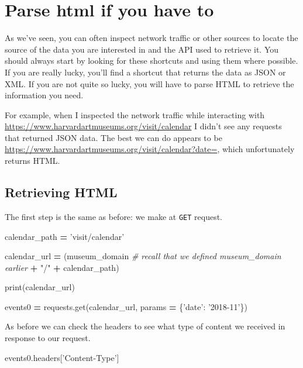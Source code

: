 \documentclass[]{book}
\newenvironment{Shaded}{\begin{snugshade}}{\end{snugshade}}
\newcommand{\StringTok}[1]{\textcolor[rgb]{0.31,0.60,0.02}{#1}}
\newcommand{\CommentTok}[1]{\textcolor[rgb]{0.56,0.35,0.01}{\textit{#1}}}
\newcommand{\OperatorTok}[1]{\textcolor[rgb]{0.81,0.36,0.00}{\textbf{#1}}}
\newcommand{\BuiltInTok}[1]{#1}
\newcommand{\NormalTok}[1]{#1}
\begin{document}
\section{Parse html if you have to}\label{parse-html-if-you-have-to}

As we've seen, you can often inspect network traffic or other sources to
locate the source of the data you are interested in and the API used to
retrieve it. You should always start by looking for these shortcuts and
using them where possible. If you are really lucky, you'll find a
shortcut that returns the data as JSON or XML. If you are not quite so
lucky, you will have to parse HTML to retrieve the information you need.

For example, when I inspected the network traffic while interacting with
\url{https://www.harvardartmuseums.org/visit/calendar} I didn't see any
requests that returned JSON data. The best we can do appears to be
\url{https://www.harvardartmuseums.org/visit/calendar?date=}, which
unfortunately returns HTML.

\subsection{Retrieving HTML}\label{retrieving-html}

The first step is the same as before: we make at \texttt{GET} request.

\begin{Shaded}
\begin{Highlighting}[]
\NormalTok{calendar_path }\OperatorTok{=} \StringTok{'visit/calendar'}

\NormalTok{calendar_url }\OperatorTok{=}\NormalTok{ (museum_domain }\CommentTok{# recall that we defined museum_domain earlier}
                  \OperatorTok{+} \StringTok{"/"}
                  \OperatorTok{+}\NormalTok{ calendar_path)}

\BuiltInTok{print}\NormalTok{(calendar_url)}

\NormalTok{events0 }\OperatorTok{=}\NormalTok{ requests.get(calendar_url, params }\OperatorTok{=}\NormalTok{ \{}\StringTok{'date'}\NormalTok{: }\StringTok{'2018-11'}\NormalTok{\})}
\end{Highlighting}
\end{Shaded}

As before we can check the headers to see what type of content we
received in response to our request.

\begin{Shaded}
\begin{Highlighting}[]
\NormalTok{events0.headers[}\StringTok{'Content-Type'}\NormalTok{]}
\end{Highlighting}
\end{Shaded}
\end{document}
